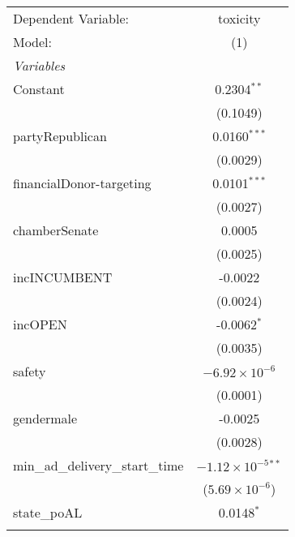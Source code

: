 \par\endgroup



\begingroup
\centering
\begin{tabular}{lc}
   \tabularnewline \midrule \midrule
   Dependent Variable:                                & toxicity\\  
   Model:                                             & (1)\\  
   \midrule
   \emph{Variables}\\
   Constant                                           & 0.2304$^{**}$\\   
                                                      & (0.1049)\\   
   partyRepublican                                    & 0.0160$^{***}$\\   
                                                      & (0.0029)\\   
   financialDonor-targeting                           & 0.0101$^{***}$\\   
                                                      & (0.0027)\\   
   chamberSenate                                      & 0.0005\\   
                                                      & (0.0025)\\   
   incINCUMBENT                                       & -0.0022\\   
                                                      & (0.0024)\\   
   incOPEN                                            & -0.0062$^{*}$\\   
                                                      & (0.0035)\\   
   safety                                             & $-6.92\times 10^{-6}$\\    
                                                      & (0.0001)\\   
   gendermale                                         & -0.0025\\   
                                                      & (0.0028)\\   
   min\_ad\_delivery\_start\_time                     & $-1.12\times 10^{-5}$$^{**}$\\    
                                                      & ($5.69\times 10^{-6}$)\\    
   state\_poAL                                        & 0.0148$^{*}$\\   
$$
\end{tabular}
